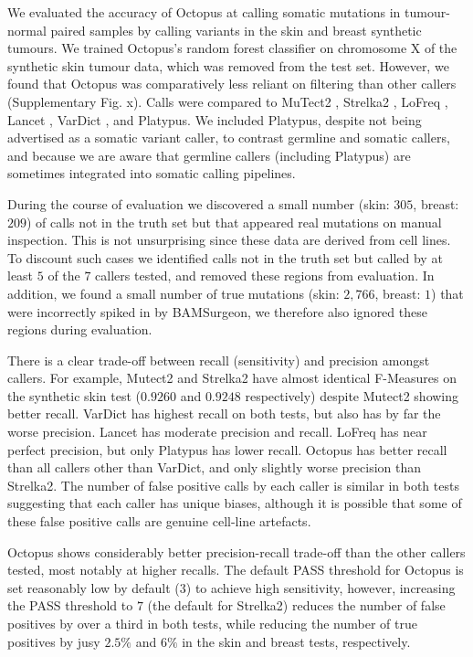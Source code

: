 \documentclass[notitlepage, twocolumn]{article}
\begin{document}
We evaluated the accuracy of Octopus at calling somatic mutations in tumour-normal paired samples by calling variants in the skin and breast synthetic tumours. We trained Octopus's random forest classifier on chromosome X of the synthetic skin tumour data, which was removed from the test set. However, we found that Octopus was comparatively less reliant on filtering than other callers (Supplementary Fig. x). Calls were compared to MuTect2 \cite{RN142}, Strelka2 \cite{RN604}, LoFreq \cite{RN601}, Lancet \cite{RN600}, VarDict \cite{RN544}, and Platypus. We included Platypus, despite not being advertised as a somatic variant caller, to contrast germline and somatic callers, and because we are aware that germline callers (including Platypus) are sometimes integrated into somatic calling pipelines.

During the course of evaluation we discovered a small number (skin: $305$, breast: $209$) of calls not in the truth set but that appeared real mutations on manual inspection. This is not unsurprising since these data are derived from cell lines. To discount such cases we identified calls not in the truth set but called by at least $5$ of the $7$ callers tested, and removed these regions from evaluation. In addition, we found a small number of true mutations (skin: $2,766$, breast: $1$) that were incorrectly spiked in by BAMSurgeon, we therefore also ignored these regions during evaluation.

There is a clear trade-off between recall (sensitivity) and precision amongst callers. For example, Mutect2 and Strelka2 have almost identical F-Measures on the synthetic skin test ($0.9260$ and $0.9248$ respectively) despite Mutect2 showing better recall. VarDict has highest recall on both tests, but also has by far the worse precision. Lancet has moderate precision and recall. LoFreq has near perfect precision, but only Platypus has lower recall. Octopus has better recall than all callers other than VarDict, and only slightly worse precision than Strelka2. The number of false positive calls by each caller is similar in both tests suggesting that each caller has unique biases, although it is possible that some of these false positive calls are genuine cell-line artefacts.

Octopus shows considerably better precision-recall trade-off than the other callers tested, most notably at higher recalls. The default PASS threshold for Octopus is set reasonably low by default ($3$) to achieve high sensitivity, however, increasing the PASS threshold to $7$ (the default for Strelka2) reduces the number of false positives by over a third in both tests, while reducing the number of true positives by jusy $2.5\%$ and $6\%$ in the skin and breast tests, respectively.
\end{document}

